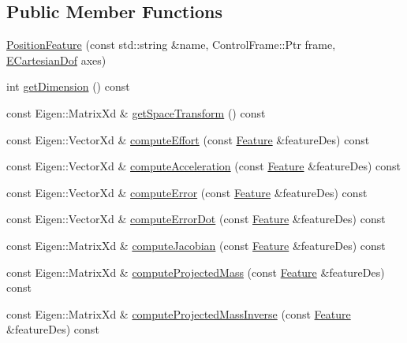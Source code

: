 \subsection*{Public Member Functions}
\begin{DoxyCompactItemize}
\item 
\hyperlink{classocra_1_1PositionFeature_abe283f029de484ca1eed44a1f9212f2f}{Position\+Feature} (const std\+::string \&name, Control\+Frame\+::\+Ptr frame, \hyperlink{namespaceocra_a436781c7059a0f76027df1c652126260}{E\+Cartesian\+Dof} axes)
\item 
int \hyperlink{classocra_1_1PositionFeature_a1fa18a892139ae4e962f189cedd699c0}{get\+Dimension} () const
\item 
const Eigen\+::\+Matrix\+Xd \& \hyperlink{classocra_1_1PositionFeature_a5ac98c0865a46c55d30fd7ab9738245c}{get\+Space\+Transform} () const
\item 
const Eigen\+::\+Vector\+Xd \& \hyperlink{classocra_1_1PositionFeature_a9cb07e0db4d84c5faa228676712e9120}{compute\+Effort} (const \hyperlink{classocra_1_1Feature}{Feature} \&feature\+Des) const
\item 
const Eigen\+::\+Vector\+Xd \& \hyperlink{classocra_1_1PositionFeature_aeff255bf903c24bd898b3d0e4fd9a14c}{compute\+Acceleration} (const \hyperlink{classocra_1_1Feature}{Feature} \&feature\+Des) const
\item 
const Eigen\+::\+Vector\+Xd \& \hyperlink{classocra_1_1PositionFeature_af347aeca5c5f531f8cae97311515814e}{compute\+Error} (const \hyperlink{classocra_1_1Feature}{Feature} \&feature\+Des) const
\item 
const Eigen\+::\+Vector\+Xd \& \hyperlink{classocra_1_1PositionFeature_a76887c9a378e9527e0afe6afad1e782b}{compute\+Error\+Dot} (const \hyperlink{classocra_1_1Feature}{Feature} \&feature\+Des) const
\item 
const Eigen\+::\+Matrix\+Xd \& \hyperlink{classocra_1_1PositionFeature_a9e609b86dcc917313b34853547738ca5}{compute\+Jacobian} (const \hyperlink{classocra_1_1Feature}{Feature} \&feature\+Des) const
\item 
const Eigen\+::\+Matrix\+Xd \& \hyperlink{classocra_1_1PositionFeature_a093701bd80310d92ea3d3f81c9ea629a}{compute\+Projected\+Mass} (const \hyperlink{classocra_1_1Feature}{Feature} \&feature\+Des) const
\item 
const Eigen\+::\+Matrix\+Xd \& \hyperlink{classocra_1_1PositionFeature_a30163c57355643a81bd119cd23a46cc1}{compute\+Projected\+Mass\+Inverse} (const \hyperlink{classocra_1_1Feature}{Feature} \&feature\+Des) const

\end{DoxyCompactItemize}
